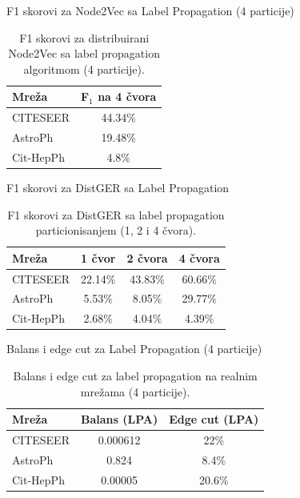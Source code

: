 \documentclass{beamer}
\begin{document}
\begin{frame}{F1 skorovi za Node2Vec sa Label Propagation (4 particije)}
\begin{table}[h!]
\centering
\begin{tabular}{lc}
\hline
\textbf{Mreža} & \textbf{F$_1$ na 4 čvora} \\
\hline
CITESEER   & 44.34\% \\
AstroPh    & 19.48\% \\
Cit-HepPh  & 4.8\% \\
\hline
\end{tabular}
\caption{F1 skorovi za distribuirani Node2Vec sa label propagation algoritmom (4 particije).}
\end{table}
\end{frame}


\begin{frame}{F1 skorovi za DistGER sa Label Propagation}
\begin{table}[h!]
\centering
\begin{tabular}{lccc}
\hline
\textbf{Mreža} & \textbf{1 čvor} & \textbf{2 čvora} & \textbf{4 čvora} \\
\hline
CITESEER   & 22.14\% & 43.83\% & 60.66\% \\
AstroPh    & 5.53\%  & 8.05\%  & 29.77\% \\
Cit-HepPh  & 2.68\%  & 4.04\%  & 4.39\% \\
\hline
\end{tabular}
\caption{F1 skorovi za DistGER sa label propagation particionisanjem (1, 2 i 4 čvora).}
\end{table}
\end{frame}

\begin{frame}{Balans i edge cut za Label Propagation (4 particije)}
\begin{table}[h!]
\centering
\begin{tabular}{lcc}
\hline
\textbf{Mreža} & \textbf{Balans (LPA)} & \textbf{Edge cut (LPA)} \\
\hline
CITESEER   & 0.000612 & 22\% \\
AstroPh    & 0.824    & 8.4\% \\
Cit-HepPh  & 0.00005  & 20.6\% \\
\hline
\end{tabular}
\caption{Balans i edge cut za label propagation na realnim mrežama (4 particije).}
\end{table}
\end{frame}
\end{document}
